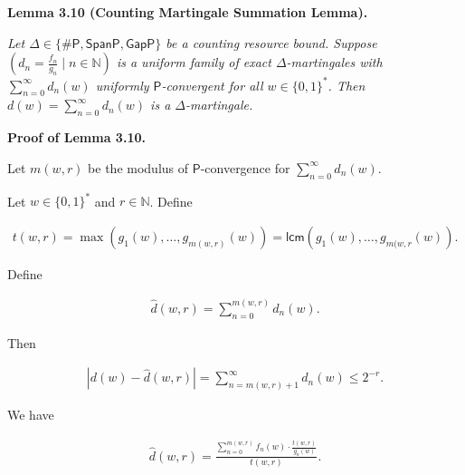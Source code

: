 \documentclass[10pt,a4paper]{article}
\begin{document}
\par\medskip\noindent\textbf{
\textbf{Lemma 3.10}\textbf{ }(Counting Martingale Summation Lemma)\textbf{.}
}\par



\emph{Let $\Delta\in\{{\mathsf{\#}\mathsf{P}},\mathsf{SpanP},\mathsf{GapP}\}$ be a counting resource bound.
Suppose $\left(d_{n}=\frac{f_{n}}{g_{n}}\mid n\in\mathbb{N}\right)$
is a uniform family of
exact $\Delta$-martingales with $\sum\limits_{n=0}^{\infty}d_{n}(w)$ uniformly
$\mathsf{P}$-convergent for all $w\in\{0,1\}^{*}$.
Then $d(w)=\sum_{n=0}^{\infty}d_{n}(w)$ is a $\Delta$-martingale.}\par







\par\medskip\noindent\textbf{Proof of Lemma 3.10.}\par




Let $m(w,r)$ be the modulus of $\mathsf{P}$-convergence for $\sum_{n=0}^{\infty}d_{n}(w)$.\par




Let $w\in\{0,1\}^{*}$ and $r\in\mathbb{N}$.
Define\par


\[\begin{gathered}
t(w,r)=\max(g_{1}(w),\ldots,g_{m(w,r)}(w))=\mathsf{lcm}(g_{1}(w),\ldots,g_{m(w,r}(w)).
\end{gathered}\]


Define\par


\[\begin{gathered}
\hat{d}(w,r)=\sum_{n=0}^{m(w,r)}d_{n}(w).
\end{gathered}\]


Then\par


\[\begin{gathered}
|d(w)-\hat{d}(w,r)|=\sum_{n=m(w,r)+1}^{\infty}d_{n}(w)\leq 2^{-r}.
\end{gathered}\]


We have\par


\[\begin{gathered}
\hat{d}(w,r)=\frac{\sum\limits_{n=0}^{m(w,r)}f_{n}(w)\cdot\frac{t(w,r)}{g_{n}(w)}}{t(w,r)}.
\end{gathered}\]
\end{document}
